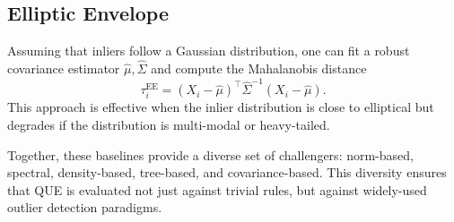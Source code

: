 \documentclass[11pt]{article}
\begin{document}
\subsection{Elliptic Envelope}
Assuming that inliers follow a Gaussian distribution, one can fit a robust covariance estimator
$\hat{\mu}, \hat{\Sigma}$ and compute the Mahalanobis distance
\[
\tau_i^{\text{EE}} = (X_i - \hat{\mu})^\top \hat{\Sigma}^{-1} (X_i - \hat{\mu}).
\]
This approach is effective when the inlier distribution is close to elliptical but degrades if the
distribution is multi-modal or heavy-tailed.

\medskip
Together, these baselines provide a diverse set of challengers: norm-based, spectral, density-based,
tree-based, and covariance-based. This diversity ensures that QUE is evaluated not just against trivial
rules, but against widely-used outlier detection paradigms.
\end{document}
